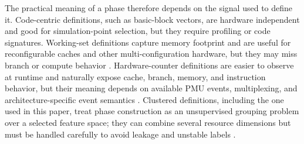 \documentclass[10pt,twocolumn]{article}
\begin{document}
The practical meaning of a phase therefore depends on the signal used to define it.
Code-centric definitions, such as basic-block vectors, are hardware independent and good for simulation-point selection, but they require profiling or code signatures.
Working-set definitions capture memory footprint and are useful for reconfigurable caches and other multi-configuration hardware, but they may miss branch or compute behavior \cite{dhodapkar2002managing,dhodapkar2003comparing}.
Hardware-counter definitions are easier to observe at runtime and naturally expose cache, branch, memory, and instruction behavior, but their meaning depends on available PMU events, multiplexing, and architecture-specific event semantics \cite{eyerman2006cpi,intel2024optimization,intel2024sdm,linux2024perf}.
Clustered definitions, including the one used in this paper, treat phase construction as an unsupervised grouping problem over a selected feature space; they can combine several resource dimensions but must be handled carefully to avoid leakage and unstable labels \cite{macqueen1967methods,lloyd1982least,jain1999data,lozano2022phase}.
\end{document}
